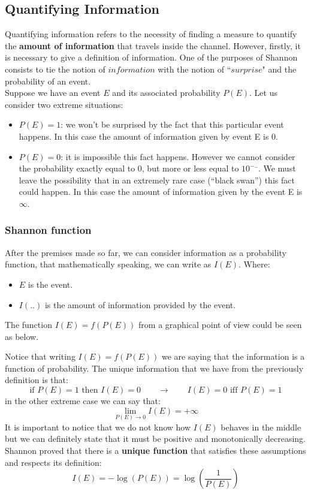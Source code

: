 \subsection{Quantifying Information}
Quantifying information refers to the necessity of finding a measure to quantify the \textbf{amount of information} that travels inside the channel. However, firstly, it is necessary to give a definition of information.
One of the purposes of Shannon consists to tie the notion of $information$ with the notion of ``$surprise$" and the probability of an event.\\
Suppose we have an event $E$ and its associated probability $P(E)$. Let us consider two extreme situations:
\begin{itemize}
	\item $P(E) = 1$: we won't be surprised by the fact that this particular event happens. In this case the amount of information given by event E is 0.
	\item $P(E) = 0$: it is impossible this fact happens. However we cannot consider the probability exactly equal to 0, but more or less equal to $10^{-..}$. We must leave the possibility that in an extremely rare case (``black swan'') this fact could happen. In this case the amount of information given by the event E is $\infty$.
\end{itemize}

\subsubsection{Shannon function} After the premises made so far, we can consider information as a probability function, that mathematically speaking, we can write as $I(E)$. Where:
\begin{itemize}
	\item $E$ is the event.
	\item $I(..)$ is the amount of information provided by the event. 
\end{itemize}
The function $I(E) = f(P(E))$ from a graphical point of view could be seen as below.

Notice that writing $I(E)= f(P(E))$ we are saying that the information is a function of probability.
The unique information that we have from the previously definition is that:
$$\text{if }P(E) = 1 \text{ then } I(E)=0 \qquad \longrightarrow \qquad I(E)=0 \text{ iff } P(E)=1$$
in the other extreme case we can say that:
$$\lim_{P(E)\rightarrow 0} I(E) = +\infty$$
It is important to notice that we do not know how $I(E)$ behaves in the middle but we can definitely state that it must be positive and monotonically decreasing. Shannon proved that there is a \textbf{unique function} that satisfies these assumptions and respects its definition:
$$I(E) = -\log(P(E)) = \log\left(\frac{1}{P(E)}\right)$$

